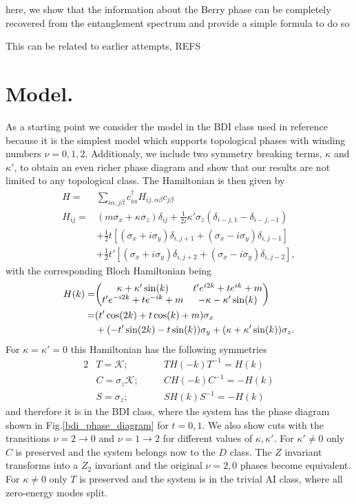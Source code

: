 \documentclass[twocolumn,amsmath,longbibliography,amssymb,superscriptaddress]{revtex4-1}
\begin{document}
here, we show that the information about the Berry phase can be completely recovered from the entanglement spectrum and provide a simple formula to do so

This can be related to earlier attempts, REFS

\section{Model.}

As a starting point we consider the model in the BDI class used in reference \cite{Song2014} because it is the simplest model which supports topological phases with winding numbers $\nu = 0,1,2$. Additionaly, we include two symmetry breaking terms, $\kappa$ and $\kappa'$, to obtain an even richer phase diagram and show that our results are not limited to any topological class. The Hamiltonian is then given by
\begin{align}
H =& \sum_{i\alpha,j\beta} c_{i\alpha}^\dagger H_{ij,\alpha \beta} c_{j\beta} \\
H_{ij} =& (m \sigma_x + \kappa \sigma_z)\delta_{ij}  + \frac{1}{2i}\kappa'\sigma_z (\delta_{i-j,1}-\delta_{i-j,-1})\\
&+ \frac{1}{2} t \left[(\sigma_x + i \sigma_y)\delta_{i,j+1} + (\sigma_x - i \sigma_y) \delta_{i,j-1} \right] \\
&+  \frac{1}{2} t' \left[(\sigma_x + i \sigma_y)\delta_{i,j+2} + (\sigma_x - i \sigma_y) \delta_{i,j-2} \right],
\label{bdi_model}
\end{align}
with the corresponding Bloch Hamiltonian being
\begin{align*}
H(k)=&\mqty( \kappa + \kappa' \sin(k) & t' e^{i2k} + t e^{ik}+m \\t' e^{-i2k} + t e^{-ik}+m & -\kappa-\kappa' \sin(k)  ) \\
=& (t' \cos(2k)+t\cos(k)+m)\sigma_x \\
&+ (-t' \sin(2k)-t\sin(k))\sigma_y + (\kappa+\kappa'\sin(k)) \sigma_z.
\end{align*}
For $\kappa = \kappa' = 0$ this Hamiltonian has the following symmetries
\begin{alignat*}{2}
&T = \mathcal{K} ; \quad &&T H(-k) T^{-1} = H(k) \\
&C = \sigma_z\mathcal{K} ; \quad &&C H(-k) C^{-1} = -H(k) \\
&S = \sigma_z ; \quad &&S H(k)S^{-1} = -H(k) 
\end{alignat*}
and therefore it is in the BDI class, where the system has the phase diagram shown in Fig.\ref{bdi_phase_diagram} for $t=0,1$. We also show cuts with the transitions $\nu = 2 \rightarrow 0$ and $\nu = 1 \rightarrow 2$ for different values of $\kappa,\kappa'$.  For $\kappa' \neq 0$ only $C$ is preserved and the system belongs now to the $D$ class. The $Z$ invariant transforms into a $Z_2$ invariant and the original $\nu = 2,0$ phases become equivalent. For $\kappa \neq 0$ only $T$ is preserved and the system is in the trivial AI class, where all zero-energy modes split.
\end{document}
